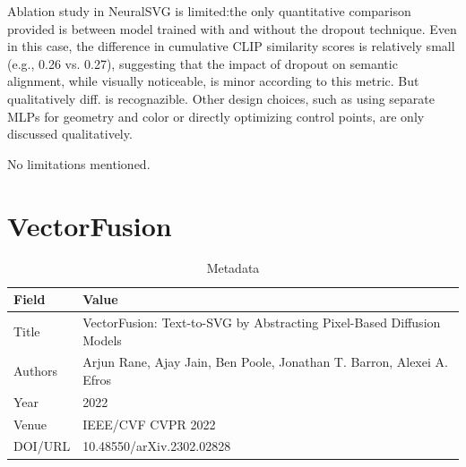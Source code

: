     \begin{table}[h!]
    \centering
    \caption{Ablation Study}

    Ablation study in NeuralSVG is limited:the only quantitative comparison provided is between model trained with and without the dropout technique. Even in this case, the difference in cumulative CLIP similarity scores is relatively small (e.g., 0.26 vs. 0.27), suggesting that the impact of dropout on semantic alignment, while visually noticeable, is minor according to this metric. But qualitatively diff. is recognazible. Other design choices, such as using separate MLPs for geometry and color or directly optimizing control points, are only discussed qualitatively.
    \end{table}
    \begin{table}[h!]
    \centering
    \caption{Limitations}
    No limitations mentioned.
    \end{table}

\chapter{VectorFusion}

\begin{table}[h!]
\centering
\caption{Metadata}
\begin{tabular}{|l|l|}
\hline
\textbf{Field} & \textbf{Value} \\ \hline
Title & VectorFusion: Text-to-SVG by Abstracting Pixel-Based Diffusion Models \\ \hline
Authors & Arjun Rane, Ajay Jain, Ben Poole, Jonathan T. Barron, Alexei A. Efros \\ \hline
Year & 2022 \\ \hline
Venue & IEEE/CVF CVPR 2022 \\ \hline
DOI/URL & 10.48550/arXiv.2302.02828 \\ \hline
\end{tabular}
\end{table}

